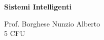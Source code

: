 \documentclass[\main/main.tex]{subfiles}
\begin{document}
\begin{titlepage}
    \begin{center}
        \vspace*{1em}
        
        \textbf{\large{Sistemi Intelligenti}}
        
        \vspace{1em}
        Prof. Borghese Nunzio Alberto
        \\
        \small{5 CFU}
        \vspace{1em}
        
		 
        
    \end{center}
\end{titlepage}
\end{document}
